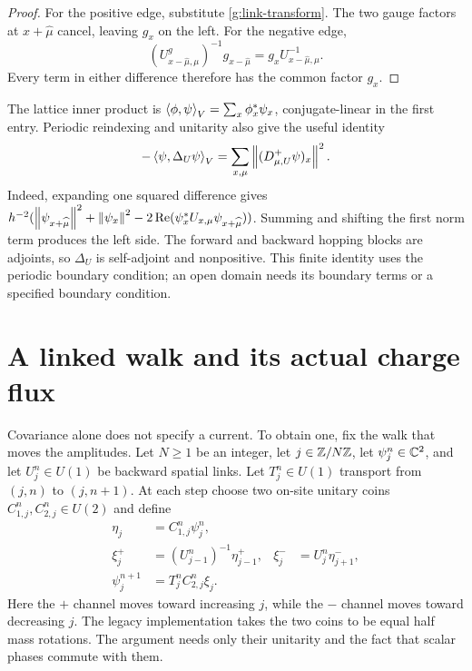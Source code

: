 \begin{proof}
For the positive edge, substitute \eqref{g:link-transform}. The two gauge factors at $x+\widehat\mu$ cancel, leaving $g_x$ on the left. For the negative edge,
\[
 (U_{x-\widehat\mu,\mu}^g)^{-1}g_{x-\widehat\mu}
 =g_xU_{x-\widehat\mu,\mu}^{-1}.
\]
Every term in either difference therefore has the common factor $g_x$.
\end{proof}

The lattice inner product is $\left\langle\phi,\psi\right\rangle_V=\sum_x\phi_x^*\psi_x$, conjugate-linear in the first entry. Periodic reindexing and unitarity also give the useful identity
\begin{equation}\label{g:laplace-form}
 -\left\langle\psi,\Delta_U\psi\right\rangle_V
 =\sum_{x,\mu}\left\lVert(D^+_{\mu,U}\psi)_x\right\rVert^2.
\end{equation}
Indeed, expanding one squared difference gives
$h^{-2}(\left\lVert\psi_{x+\widehat\mu}\right\rVert^2+\left\lVert\psi_x\right\rVert^2
-2\operatorname{Re}(\psi_x^*U_{x,\mu}\psi_{x+\widehat\mu}))$.
Summing and shifting the first norm term produces the left side. The forward and backward hopping blocks are adjoints, so $\Delta_U$ is self-adjoint and nonpositive. This finite identity uses the periodic boundary condition; an open domain needs its boundary terms or a specified boundary condition.




\section{A linked walk and its actual charge flux}\label{g:linked-walk}

Covariance alone does not specify a current. To obtain one, fix the walk that moves the amplitudes. Let $N\ge1$ be an integer, let $j\in\mathbb Z/N\mathbb Z$, let $\psi_j^n\in\mathbb C^2$, and let $U_j^n\in U(1)$ be backward spatial links. Let $T_j^n\in U(1)$ transport from $(j,n)$ to $(j,n+1)$. At each step choose two on-site unitary coins $C_{1,j}^n,C_{2,j}^n\in U(2)$ and define
\begin{align}
 \eta_j&=C_{1,j}^n\psi_j^n,\label{g:walk-coin}\\
 \xi_j^+&=(U_{j-1}^n)^{-1}\eta_{j-1}^+,
 &\xi_j^-&=U_j^n\eta_{j+1}^-,\label{g:walk-shift}\\
 \psi_j^{n+1}&=T_j^n C_{2,j}^n\xi_j.\label{g:walk-step}
\end{align}
Here the $+$ channel moves toward increasing $j$, while the $-$ channel moves toward decreasing $j$. The legacy implementation takes the two coins to be equal half mass rotations. The argument needs only their unitarity and the fact that scalar phases commute with them.

